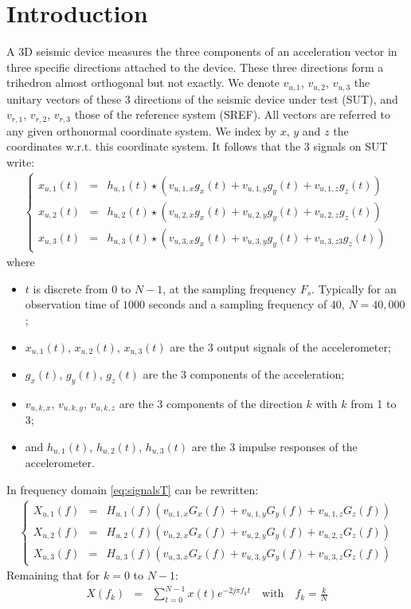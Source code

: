\documentclass[a4paper, 12pt]{report}
\begin{document}
 \sloppy
\section{Introduction}
A 3D seismic device measures the three components of an acceleration vector in three specific directions attached to the device. These three directions form a trihedron almost orthogonal but not exactly. We denote $v_{u,1}$,  $v_{u,2}$,  $v_{u,3}$ the unitary vectors of these 3 directions of the seismic device under test (SUT), and  $v_{r,1}$,  $v_{r,2}$,  $v_{r,3}$ those of the reference system (SREF). All vectors are referred to any given orthonormal coordinate system. We index by $x$, $y$ and $z$ the coordinates w.r.t. this coordinate system. It follows that the 3 signals on SUT write:
\begin{eqnarray}
\label{eq:signalsT}
\left\{
\begin{array}{rcl}
x_{u,1}(t)&=&h_{u,1}(t)\star (v_{u,1,x}g_{x}(t)+v_{u,1,y}g_{y}(t)+v_{u,1,z}g_{z}(t))
\\
x_{u,2}(t)&=&h_{u,2}(t)\star (v_{u,2,x}g_{x}(t)+v_{u,2,y}g_{y}(t)+v_{u,2,z}g_{z}(t))
\\
x_{u,3}(t)&=&h_{u,3}(t)\star (v_{u,3,x}g_{x}(t)+v_{u,3,y}g_{y}(t)+v_{u,3,z3}g_{z}(t))
\end{array}
\right.
\end{eqnarray}
where 
\begin{itemize}
\item
$t$ is discrete from $0$ to $N-1$, at the sampling frequency $F_{s}$. Typically for an observation time of $1000$ seconds and a sampling frequency of $40$, $N=40,\!000$;
\item
$x_{u,1}(t)$, $x_{u,2}(t)$, $x_{u,3}(t)$  are the 3 output signals of the accelerometer;
\item
$g_{x}(t)$, $g_{y}(t)$, $g_{z}(t)$ are the 3 components  of the acceleration;
\item
$v_{u,k,x}$, $v_{u,k,y}$, $v_{u,k,z}$ are the 3 components of the direction $k$ with $k$ from 1 to 3;
\item
and $h_{u,1}(t)$, $h_{u,2}(t)$, $h_{u,3}(t)$  are the 3 impulse responses of the accelerometer.
\end{itemize}
In frequency domain \eqref{eq:signalsT} can be rewritten:
\begin{eqnarray}
\label{eq:signalsF}
\left\{
\begin{array}{rcl}
X_{u,1}(f)&=&H_{u,1}(f) (v_{u,1,x}G_{x}(f)+v_{u,1,y}G_{y}(f)+v_{u,1,z}G_{z}(f))
\\
X_{u,2}(f)&=&H_{u,2}(f) (v_{u,2,x}G_{x}(f)+v_{u,2,y}G_{y}(f)+v_{u,2,z}G_{z}(f))
\\
X_{u,3}(f)&=&H_{u,3}(f) (v_{u,3,x}G_{x}(f)+v_{u,3,y}G_{y}(f)+v_{u,3,z}G_{z}(f))
\end{array}
\right.
\end{eqnarray}
Remaining that for $k=0$ to $N-1$:
\begin{eqnarray}
X(f_{k})&=&\sum_{t=0}^{N-1}x(t)e^{-2j\pi f_{k}t}\quad \mathrm{with}\quad f_{k}=\frac{k}{N} 
\end{eqnarray}
\end{document}
